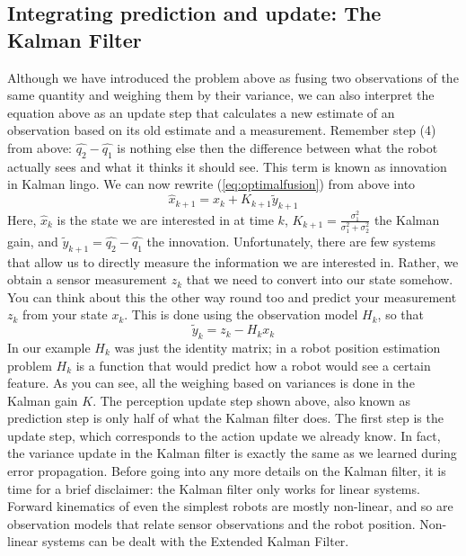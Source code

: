 \subsection{Integrating prediction and update: The Kalman Filter}
Although we have introduced the problem above as fusing two observations of the same quantity and weighing them by their variance, we can also interpret the equation above as an update step that calculates a new estimate of an observation based on its old estimate and a measurement. Remember step (4) from above: $ \hat{q_2}-\hat{q_1}$ is nothing else then the difference between what the robot actually sees and what it thinks it should see. This term is known as innovation in Kalman lingo. We can now 
rewrite (\ref{eq:optimalfusion}) from above into
\begin{equation}
\hat{x}_{k+1}=\hat{x}_k+K_{k+1}\tilde{y}_{k+1}
\end{equation}
Here, $ \hat{x}_k$ is the state we are interested in at time $ k$, $ K_{k+1}=\frac{\sigma_1^2}{\sigma_1^2+\sigma_2^2}$ the Kalman gain, and $ \tilde{y}_{k+1}=\hat{q_2}-\hat{q_1}$  the innovation. Unfortunately, there are few systems that allow us to directly measure the information we are interested in. Rather, we obtain a sensor measurement $ z_k$ that we need to convert into our state somehow. You can think about this the other way round too and predict your measurement $ z_k$ from your state $ x_k$. This is done using the observation model $ H_k$, so that
\begin{equation}
\tilde{y}_{k}=z_k-H_k x_k
\end{equation}
In our example $ H_k$ was just the identity matrix; in a robot position estimation problem $ H_k$ is a function that would predict how a robot would see a certain feature. As you can see, all the weighing based on variances is done in the Kalman gain $ K$.
The perception update step shown above, also known as prediction step is only half of what the Kalman filter does. The first step is the update step, which corresponds to the action update we already know. In fact, the variance update in the Kalman filter is exactly the same as we learned during error propagation. Before going into any more details on the Kalman filter, it is time for a brief disclaimer: the Kalman filter only works for linear systems. Forward kinematics of even the simplest robots are mostly non-linear, and so are observation models that relate sensor observations and the robot position. Non-linear systems can be dealt with the Extended Kalman Filter.

